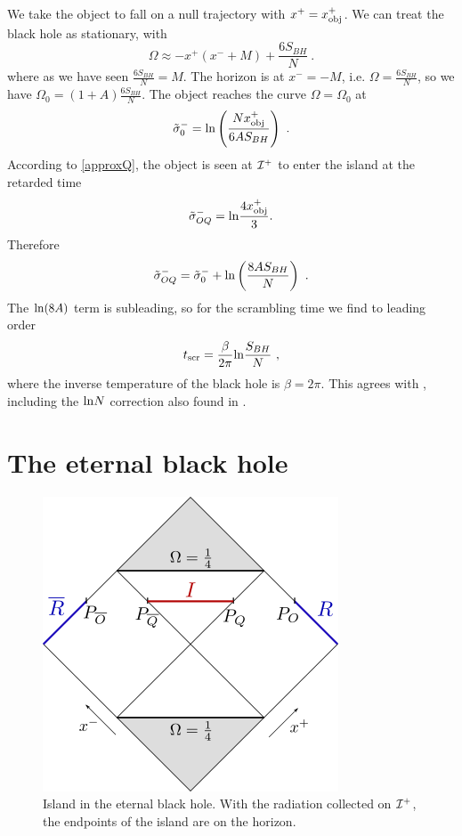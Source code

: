 \documentclass[11pt,oneside,letterpaper]{article}
\newcommand{\be}{\begin{equation}}
\newcommand{\ee}{\end{equation}}
\def\be{\begin{eqnarray}}
\def\ee{\end{eqnarray}}
\def\be{\begin{equation}}
\def\ee{\end{equation}}
\def\m{{M}}
\def\log{{\rm ln}}
\numberwithin{equation}{section}
\def \be {\begin{equation}}
\def \ee {\end{equation}}
\begin{document}
We take the object to fall on a null trajectory with $x^+ = x^+_{\rm obj}$. We can treat the black hole as stationary, with
\be
\Omega \approx -  x^+ (x^-+M) + \frac{6S_{BH}}{N} \ .
\ee
where as we have seen $\frac{6S_{BH}}{N}=\m$.  The horizon is at $x^-=-M$, i.e. $\Omega = \frac{6S_{BH}}{N}$, so we have $\Omega_0 = (1+A)\frac{6S_{BH}}{N}$.   The object reaches the curve $\Omega = \Omega_0$  at 
\be
\tsigma^-_0 =  \log \left( \frac{N  x_{\rm obj}^+}{6A S_{BH}} \right) \ .
\ee
According to \eqref{approxQ}, the object is seen at ${\cal I}^+$ to enter the island at the retarded time 
\be
 { \tsigma^-_{OQ}}=\log \frac{4x^+_{\rm obj}}{3}.
\ee
Therefore 
\be
\tsigma^-_{OQ} = \tsigma_0^- + \log\left( \frac{8AS_{BH}}{N} \right) \ .
\ee
The $\log(8A)$ term is subleading, so for the scrambling time we find to leading order 
\be
t_{\rm scr} = \frac{\beta}{2\pi}\log \frac{S_{BH}}{N} \ ,
\ee
where the inverse temperature of the black hole is $\beta ={2\pi}{}$. This agrees with \cite{Hayden:2007cs,Sekino:2008he}, including the $\log N$ correction also found in \cite{Penington:2019npb}.





\section{The eternal black hole}
\begin{figure}
\begin{center}
\includegraphics[scale=1.0]{figures/eternalBH.png}
\end{center}
\caption{\small Island in the eternal black hole. With the radiation collected on ${\cal I}^+$, the endpoints of the island are on the horizon. \label{fig:eternalBH}}
\end{figure}
\end{document}
